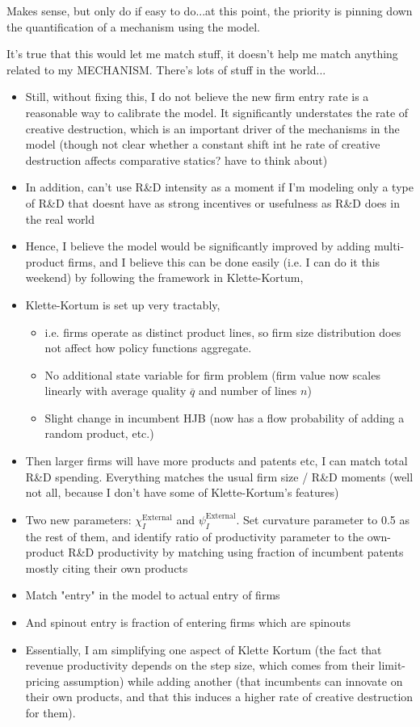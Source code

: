 \documentclass[12pt,english]{article}
\theoremstyle{remark}
\begin{document}
Makes sense, but only do if easy to do...at this point, the priority is pinning down the quantification of a mechanism using the model. 

It's true that this would let me match stuff, it doesn't help me match anything related to my MECHANISM. There's lots of stuff in the world...

\begin{itemize}
	\item Still, without fixing this, I do not believe the new firm entry rate is a reasonable way to calibrate the model. It significantly understates the rate of creative destruction, which is an important driver of the mechanisms in the model (though not clear whether a constant shift int he rate of creative destruction affects comparative statics? have to think about)
	\item In addition, can't use R\&D intensity as a moment if I'm modeling only a type of R\&D that doesnt have as strong incentives or usefulness as R\&D does in the real world
	\item Hence, I believe the model would be significantly improved by adding multi-product firms, and I believe this can be done easily (i.e. I can do it this weekend) by following the framework in Klette-Kortum,
	\item Klette-Kortum is set up very tractably, 
	\begin{itemize}
		\item i.e. firms operate as distinct product lines, so firm size distribution does not affect how policy functions aggregate. 
		\item No additional state variable for firm problem (firm value now scales linearly with average quality $\overline{q}$ and number of lines $n$)
		\item Slight change in incumbent HJB (now has a flow probability of adding a random product, etc.)
	\end{itemize}
	\item Then larger firms will have more products and patents etc, I can match total R\&D spending. Everything matches the usual firm size / R\&D moments (well not all, because I don't have some of Klette-Kortum's features)
	\item Two new parameters: $\chi_I^{\textrm{External}}$ and $\psi_I^{\textrm{External}}$. Set curvature parameter to 0.5 as the rest of them, and identify ratio of productivity parameter to the own-product R\&D productivity by matching using fraction of incumbent patents mostly citing their own products
	\item Match "entry" in the model to actual entry of firms
	\item And spinout entry is fraction of entering firms which are spinouts
	\item Essentially, I am simplifying one aspect of Klette Kortum (the fact that revenue productivity depends on the step size, which comes from their limit-pricing assumption) while adding another (that incumbents can innovate on their own products, and that this induces a higher rate of creative destruction for them). 
\end{itemize}
\end{document}
